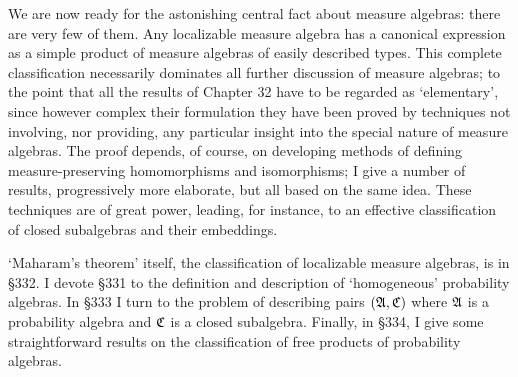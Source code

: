  
\def\chaptername{Maharam's theorem} 
\def\sectionname{Introduction} 
 
 
We are now ready for the astonishing central fact about measure 
algebras:  there are very few of them.   Any localizable measure algebra 
has a canonical expression as a simple product of measure algebras of 
easily described types.   This complete classification necessarily 
dominates all further discussion of measure algebras;  to the point that 
all the results of Chapter 32 have to be regarded as `elementary', since 
however complex their formulation they have been proved by techniques 
not involving, nor providing, any particular insight into the special 
nature of measure algebras.   The proof depends, of course, on 
developing methods of defining measure-preserving homomorphisms and 
isomorphisms;  I give a number of results, progressively more elaborate, 
but all based on the same idea.   These techniques are of great power, 
leading, for instance, to an effective classification of closed 
subalgebras and their embeddings. 
 
`Maharam's theorem' itself, the classification of localizable measure 
algebras, is in \S332.   I devote \S331 to the definition and 
description of `homogeneous' probability algebras.   In \S333 I turn to 
the problem of describing pairs $(\frak A,\frak C)$ where $\frak A$ is a 
probability algebra and $\frak C$ is a closed subalgebra.   Finally, in 
\S334, I give some straightforward results on the classification of free 
products of probability algebras. 
 
 
 
 
\discrpage 
 
 
